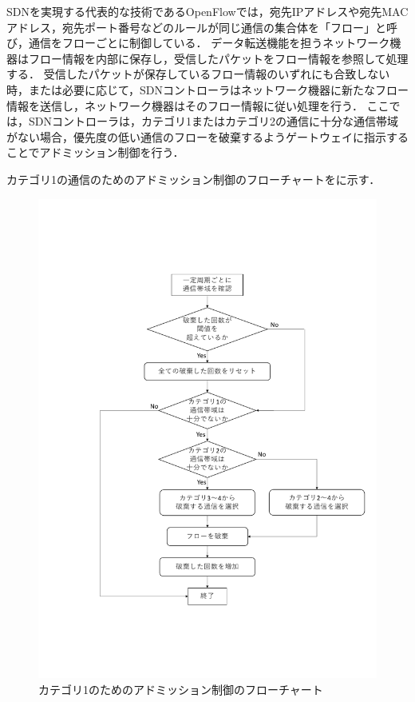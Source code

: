 \documentclass[a4paper,11pt,uplatex]{ujreport}
\begin{document}
  SDNを実現する代表的な技術であるOpenFlowでは，宛先IPアドレスや宛先MACアドレス，宛先ポート番号などのルールが同じ通信の集合体を「フロー」と呼び，通信をフローごとに制御している．
  データ転送機能を担うネットワーク機器はフロー情報を内部に保存し，受信したパケットをフロー情報を参照して処理する．
  受信したパケットが保存しているフロー情報のいずれにも合致しない時，または必要に応じて，SDNコントローラはネットワーク機器に新たなフロー情報を送信し，ネットワーク機器はそのフロー情報に従い処理を行う．
  ここでは，SDNコントローラは，カテゴリ1またはカテゴリ2の通信に十分な通信帯域がない場合，優先度の低い通信のフローを破棄するようゲートウェイに指示することでアドミッション制御を行う．\par

  カテゴリ1の通信のためのアドミッション制御のフローチャートをに示す．\par

  \begin{figure}[!tb]
    \centering
    \includegraphics[width=\linewidth]{img/adomission_c1.pdf}
    \caption{カテゴリ1のためのアドミッション制御のフローチャート}
    \label{fig:adomission}
  \end{figure}
\end{document}
